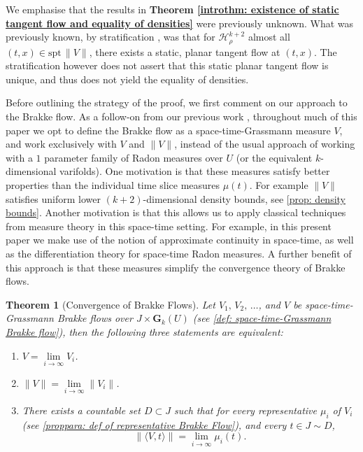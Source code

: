 \documentclass{article}
\theoremstyle{plain}
\theoremstyle{definition}
\theoremstyle{plain}
\theoremstyle{remark}
\theoremstyle{remark}
\theoremstyle{plain}
\newtheorem{introTheorem}{Theorem}
\begin{document}
We emphasise that the results in \textbf{Theorem \ref{introthm: existence of static tangent flow and equality of densities}} were previously unknown.
What was previously known, by stratification \cite{White1997}, was that for $\mathscr{H}^{k + 2}_{\rho}$ almost all $(t, x) \in \mathrm{spt} \, \| V \|$, there exists a static, planar tangent flow at $(t, x)$. 
The stratification however does not assert that this static planar tangent flow is unique, and thus does not yield the equality of densities.

Before outlining the strategy of the proof, we first comment on our approach to the Brakke flow. 
As a follow-on from our previous work \cite{LW-Space-Time-GrassmannMeasureBrakkeFlow}, throughout much of this paper we opt to define the Brakke flow as a space-time-Grassmann measure $V$, and work exclusively with $V$ and $\| V \|$, instead of the usual approach of working with a $1$ parameter family of Radon measures over $U$ (or the equivalent $k$-dimensional varifolds).
One motivation is that these measures satisfy better properties than the individual time slice measures $\mu (t)$. 
For example $\| V \|$ satisfies uniform lower $(k + 2)$-dimensional density bounds, see \ref{prop: density bounds}.
Another motivation is that this allows us to apply classical techniques from measure theory in this space-time setting.
For example, in this present paper we make use of the notion of approximate continuity in space-time, as well as the differentiation theory for space-time Radon measures. 
A further benefit of this approach is that these measures simplify the convergence theory of Brakke flows.

\begin{introTheorem}[Convergence of Brakke Flows]\label{introprop: convergence of Brakke flows} 
    Let $V_{1}, \, V_{2}, \, \ldots$, and $V$ be space-time-Grassmann Brakke flows over $J \times \mathbf{G}_{k} (U)$ (see \ref{def: space-time-Grassmann Brakke flow}), then the following three statements are equivalent: 
    \begin{enumerate}[label=\ref{introprop: convergence of Brakke flows}.\arabic{enumi}]
         \item \label{introprop: convergence of Brakke flows:1} $V = \lim\limits_{i\to\infty} V_i$. 
        \item \label{introprop: convergence of Brakke flows:2} $\|V\| = \lim\limits_{i\to\infty} \|V_i\|$.
        \item \label{introprop: convergence of Brakke flows:3} 
        There exists a countable set $D \subset J$ such that for every representative $\mu_i$ of $V_{i}$ (see \ref{proppara: def of representative Brakke Flow}), and every $t\in J \sim D$,
        \[
            \| \langle V, t \rangle \| = \lim\limits_{i\to\infty} \mu_i(t).
        \]
    \end{enumerate}
\end{introTheorem}
\end{document}
